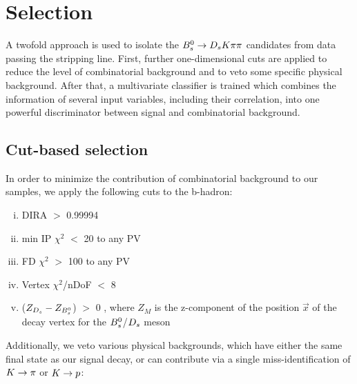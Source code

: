 \section{Selection}
\label{sec:Selection}

A twofold approach is used to isolate the ${{B}^0_{s}}\rightarrow{\ensuremath{{D}_{s}}}{\ensuremath{K}}{\ensuremath{\pi}}{\ensuremath{\pi}}$ candidates from data passing the stripping line. 
First, further one-dimensional cuts are applied to reduce the level of combinatorial background and to veto some specific physical background. 
After that, a multivariate classifier is trained which combines the information of several input variables, including their correlation, into one powerful discriminator
between signal and combinatorial background. 

\subsection{Cut-based selection}

In order to minimize the contribution of combinatorial background to our samples, we apply the following cuts to the b-hadron:

\begin{enumerate}[(i)]

\item DIRA $>$ 0.99994

\item min IP $\chi^{2}$ $<$ 20 to any PV

\item FD $\chi^{2}$ $>$ 100 to any PV

\item Vertex $\chi^{2}$/nDoF $<$ 8 

\item ($Z_{{{D}_{s}}}-Z_{{{B}^0_{s}}}$) $>$ 0 , where $Z_{M}$ is the z-component of the position $\vec{x}$ of the decay vertex for the ${{B}^0_{s}}$/${{D}_{s}}$ meson

\end{enumerate}    


Additionally, we veto various physical backgrounds, which have either the same final state as our signal decay, or can contribute via a single miss-identification of ${K}\rightarrow{\ensuremath{\pi}}$ or ${K}\rightarrow{\ensuremath{p}}$:

